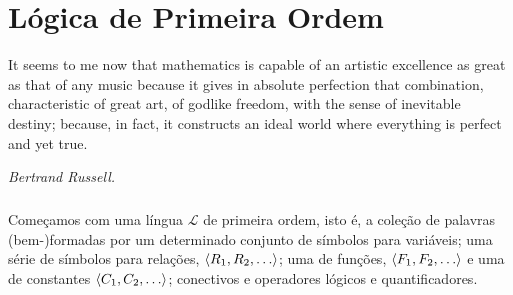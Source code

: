 \chapter{Lógica de Primeira Ordem}
    \epigraph{\justify
        It seems to me now that mathematics 
        is capable of an artistic excellence 
        as great as that of any music 
        \elide because it gives in absolute 
        perfection that combination, 
        characteristic of great art, of godlike 
        freedom, with the sense of inevitable 
        destiny; because, in fact, it constructs 
        an ideal world where everything is 
        perfect and yet true.
        }{\textit{Bertrand Russell.}}    
    \cls
    \paragraph{}
        Começamos com uma língua $\mathcal{L}$ de primeira ordem, isto é, 
        a coleção de palavras (bem-)formadas por um determinado conjunto de 
        símbolos para variáveis; uma série de símbolos para relações,
        $\TUPLE{R_1}{R_2}{\ldots}$; uma de funções, $\TUPLE{F_1}{F_2}{\ldots}$
        e uma de constantes $\TUPLE{C_1}{C_2}{\ldots}$; conectivos e operadores 
        lógicos e quantificadores.
